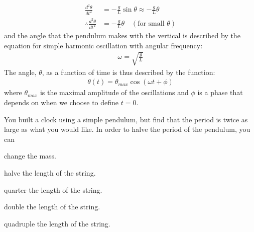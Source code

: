 \begin{align*}
\frac{d^2\theta}{dt^2} &= -\frac{g}{L}\sin\theta \approx -\frac{g}{L}\theta \\
\therefore \frac{d^2\theta}{dt^2} &=-\frac{g}{L}\theta \quad (\text{for small }\theta)
\end{align*}
and the angle that the pendulum makes with the vertical is described by the equation for simple harmonic oscillation with angular frequency:
\begin{align*}
\omega = \sqrt{\frac{g}{L}}
\end{align*}
The angle, $\theta$, as a function of time is thus described by the function:
\begin{align*}
\theta(t) = \theta_{max}\cos(\omega t +\phi)
\end{align*}
where $\theta_{max}$ is the maximal amplitude of the oscillations and $\phi$ is a phase that depends on when we choose to define $t=0$.

\begin{checkpoint}\label{cp:simpleharmonicmotion:pendulum}
\begin{MCquestion}{You built a clock using a simple pendulum, but find that the period is twice as large as what you would like. In order to halve the period of the pendulum, you can}
\item change the mass.
\item halve the length of the string.
\item quarter the length of the string.\correct
\item double the length of the string.
\item quadruple the length of the string.
\end{MCquestion}
\end{checkpoint}

